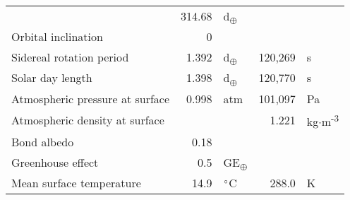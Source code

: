 \begin{tabular}{|p{4cm}|r l|r l|}
  & 314.68 & d\textsubscript{$\oplus$} & & \\
  Orbital inclination & 0 & & & \\
  Sidereal rotation period & 1.392 & d\textsubscript{$\oplus$} & 120,269 & s \\
  Solar day length & 1.398 & d\textsubscript{$\oplus$} & 120,770 & s \\
  Atmospheric pressure at surface & 0.998 & atm & 101,097 & Pa \\
  Atmospheric density at surface & & & 1.221 & kg$\cdot$m\textsuperscript{-3} \\
  Bond albedo & 0.18 & & & \\
  Greenhouse effect & 0.5 & GE\textsubscript{$\oplus$} & & \\
  Mean surface temperature & 14.9 & $\degree$C & 288.0 & K \\
  \hline
\end{tabular}
\newpage
